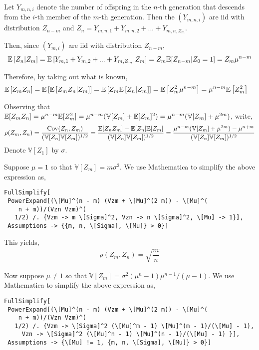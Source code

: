 \begin{solution}[Solution]
Let \( Y_{m,n,i} \) denote the number of offspring in the \( n \)-th generation that descends from the \( i \)-th member of the \( m \)-th generation. Then the \( (Y_{m,n,i}) \) are iid with distribution \( Z_{n-m} \) and \( Z_n = Y_{m,n,1}+Y_{m,n,2}+...+Y_{m,n,Z_m} \). 


Then, since \( (Y_{m,i}) \) are iid with distribution \( Z_{n-m} \),
\begin{align*}
    \mathbb{E} \left[ Z_n | Z_m \right] = \mathbb{E} \left[ Y_{m,1}+Y_{m,2}+...+Y_{m,Z_m} | Z_m \right] = Z_m \mathbb{E}[Z_{n-m} | Z_0=1] = Z_m \mu^{n-m}
\end{align*}

Therefore, by taking out what is known,
\begin{align*}
    \mathbb{E} \left[ Z_mZ_n \right] &= \mathbb{E} \left[ \mathbb{E} \left[ Z_mZ_n | Z_m \right] \right] = \mathbb{E} \left[ Z_m \mathbb{E}  \left[ Z_n | Z_m \right] \right] 
    = \mathbb{E} \left[ Z_m^2 \mu^{n-m} \right] = \mu^{n-m}\mathbb{E} \left[ Z_m^2 \right]
\end{align*}

Observing that \( \mathbb{E}[Z_mZ_n] = \mu^{n-m}\mathbb{E}[Z_m^2] = \mu^{n-m}(\mathbb{V}[Z_m] + \mathbb{E}[Z_m]^2) = \mu^{n-m}(\mathbb{V}[Z_m]+\mu^{2m}) \), write,
\begin{align*}
    \rho(Z_m,Z_n) &= \dfrac{\operatorname{Cov}(Z_n,Z_m)}{(\mathbb{V}[Z_n] \mathbb{V}[Z_m])^{1/2}} 
    = \dfrac{\mathbb{E}[Z_nZ_m]-\mathbb{E}[Z_n]\mathbb{E}[Z_m]}{(\mathbb{V}[Z_n]\mathbb{V}[Z_m])^{1/2}} 
    = \dfrac{\mu^{n-m}(\mathbb{V}[Z_m]+\mu^{2m})-\mu^{n+m}}{(\mathbb{V}[Z_n]\mathbb{V}[Z_m])^{1/2}} \\
\end{align*}
Denote \( \mathbb{V}[Z_1] \) by \( \sigma \).


Suppose \( \mu=1 \) so that \( \mathbb{V}[Z_m]=m\sigma^2 \). We use Mathematica to simplify the above expression as,
\begin{lstlisting}
FullSimplify[
 PowerExpand[(\[Mu]^(n - m) (Vzm + \[Mu]^(2 m)) - \[Mu]^(
    n + m))/(Vzn Vzm)^(
   1/2) /. {Vzm -> m \[Sigma]^2, Vzn -> n \[Sigma]^2, \[Mu] -> 1}], 
 Assumptions -> {{m, n, \[Sigma], \[Mu]} > 0}]    
\end{lstlisting}

This yields,
\begin{align*}
    \rho(Z_m,Z_n) = \sqrt{\dfrac{m}{n}}
\end{align*}

    
Now suppose \( \mu\neq 1 \) so that \( \mathbb{V}[Z_m] = \sigma^2(\mu^n-1)\mu^{n-1}/(\mu-1) \). We use Mathematica to simplify the above expression as,
\begin{lstlisting}
FullSimplify[
 PowerExpand[(\[Mu]^(n - m) (Vzm + \[Mu]^(2 m)) - \[Mu]^(
    n + m))/(Vzn Vzm)^(
   1/2) /. {Vzm -> \[Sigma]^2 (\[Mu]^m - 1) \[Mu]^(m - 1)/(\[Mu] - 1),
     Vzn -> \[Sigma]^2 (\[Mu]^n - 1) \[Mu]^(n - 1)/(\[Mu] - 1) }], 
 Assumptions -> {\[Mu] != 1, {m, n, \[Sigma], \[Mu]} > 0}]
\end{lstlisting}


\end{solution}
